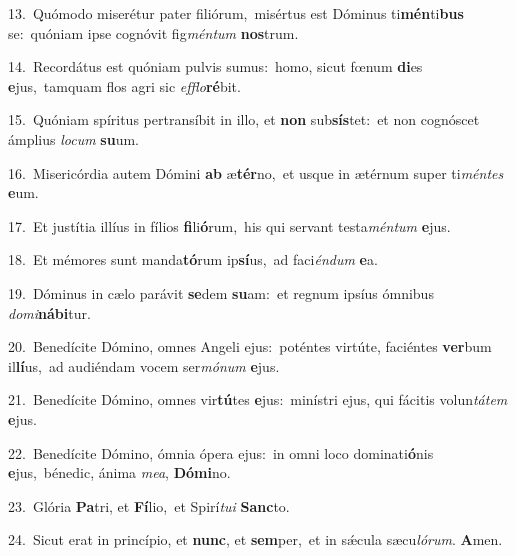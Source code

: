 {\numbfont\textcolor{\numbcolor}{13.}}~Quómodo miserétur pater filiórum,~\dagger misértus est Dóminus ti\-\textbf{mén}\-ti\textbf{bus} se:~\star quóniam ipse cognóvit fig\-\textit{mén}\-\textit{tum} \textbf{nos}\-trum.\par
{\numbfont\textcolor{\numbcolor}{14.}}~Recordátus est quóniam pulvis sumus:~\dagger homo, sicut fœnum \textbf{di}\-es \textbf{e}\-jus,~\star tamquam flos agri sic \textit{ef}\-\textit{flo}\textbf{ré}bit.\par
{\numbfont\textcolor{\numbcolor}{15.}}~Quóniam spíritus pertransíbit in illo, et \textbf{non} sub\-\textbf{sís}\-tet:~\star et non cognóscet ámplius \textit{lo}\-\textit{cum} \textbf{su}\-um.\par
{\numbfont\textcolor{\numbcolor}{16.}}~Misericórdia autem Dómini \textbf{ab} æ\-\textbf{tér}\-no,~\star et usque in ætérnum super ti\-\textit{mén}\-\textit{tes} \textbf{e}\-um.\par
{\numbfont\textcolor{\numbcolor}{17.}}~Et justítia illíus in fílios \textbf{fi}\-li\-\textbf{ó}\-rum,~\star his qui servant testa\-\textit{mén}\-\textit{tum} \textbf{e}\-jus.\par
{\numbfont\textcolor{\numbcolor}{18.}}~Et mémores sunt manda\-\textbf{tó}\-rum ip\-\textbf{sí}\-us,~\star ad faci\-\textit{én}\-\textit{dum} \textbf{e}\-a.\par
{\numbfont\textcolor{\numbcolor}{19.}}~Dóminus in cælo parávit \textbf{se}\-dem \textbf{su}\-am:~\star et regnum ipsíus ómnibus \textit{do}\-\textit{mi}\textbf{ná}\textbf{bi}tur.\par
{\numbfont\textcolor{\numbcolor}{20.}}~Benedícite Dómino, omnes Angeli ejus:~\dagger poténtes virtúte, faciéntes \textbf{ver}\-bum il\-\textbf{lí}\-us,~\star ad audiéndam vocem ser\-\textit{mó}\-\textit{num} \textbf{e}\-jus.\par
{\numbfont\textcolor{\numbcolor}{21.}}~Benedícite Dómino, omnes vir\-\textbf{tú}\-tes \textbf{e}\-jus:~\star minístri ejus, qui fácitis volun\-\textit{tá}\-\textit{tem} \textbf{e}\-jus.\par
{\numbfont\textcolor{\numbcolor}{22.}}~Benedícite Dómino, ómnia ópera ejus:~\dagger in omni loco dominati\-\textbf{ó}\-nis \textbf{e}\-jus,~\star bénedic, ánima \textit{me}\-\textit{a}, \textbf{Dó}\-\textbf{mi}no.\par
{\numbfont\textcolor{\numbcolor}{23.}}~Glória \textbf{Pa}\-tri, et \textbf{Fí}\-lio,~\star et Spirí\-\textit{tu}\-\textit{i} \textbf{Sanc}\-to.\par
{\numbfont\textcolor{\numbcolor}{24.}}~Sicut erat in princípio, et \textbf{nunc}\-, et \textbf{sem}\-per,~\star et in sǽcula sæcu\-\textit{ló}\-\textit{rum}. \textbf{A}\-men.\par
